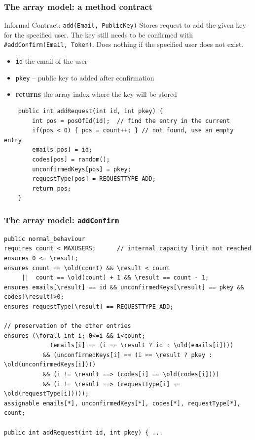 \documentclass{beamer}
\begin{document}
\begin{frame}[fragile]
    \frametitle{The array model: a method contract}
    \begin{block}{Informal Contract: \texttt{add(Email, PublicKey)}}
      Stores request to add the given key for the specified user. The key still
      needs to be confirmed with \texttt{#addConfirm(Email, Token)}. Does nothing if
      the specified user does not exist.
     
    \begin{itemize}
    \item \texttt{id} the email of the user
     \item \texttt{pkey}  -- public key to added after confirmation
     \item \textbf{returns} the array index where the key will be stored
    \end{itemize}
     
    \end{block}
    
    \begin{lstlisting}
    public int addRequest(int id, int pkey) {
        int pos = posOfId(id);  // find the entry in the current
        if(pos < 0) { pos = count++; } // not found, use an empty entry
        emails[pos] = id;
        codes[pos] = random(); 
        unconfirmedKeys[pos] = pkey;
        requestType[pos] = REQUESTTYPE_ADD;
        return pos;
    }
    \end{lstlisting}
\end{frame}

\begin{frame}[fragile]
    \frametitle{The array model: \texttt{addConfirm}}
\begin{lstlisting}
public normal_behaviour
requires count < MAXUSERS;      // internal capacity limit not reached
ensures 0 <= \result;           
ensures count == \old(count) && \result < count
     ||  count == \old(count) + 1 && \result == count - 1;
ensures emails[\result] == id && unconfirmedKeys[\result] == pkey && codes[\result]>0;
ensures requestType[\result] == REQUESTTYPE_ADD;

// preservation of the other entries
ensures (\forall int i; 0<=i && i<count;
             (emails[i] == (i == \result ? id : \old(emails[i])))
           && (unconfirmedKeys[i] == (i == \result ? pkey : \old(unconfirmedKeys[i])))
           && (i != \result ==> (codes[i] == \old(codes[i])))
           && (i != \result ==> (requestType[i] == \old(requestType[i]))));
assignable emails[*], unconfirmedKeys[*], codes[*], requestType[*], count;

public int addRequest(int id, int pkey) { ...
\end{lstlisting}
\end{frame}
\end{document}

